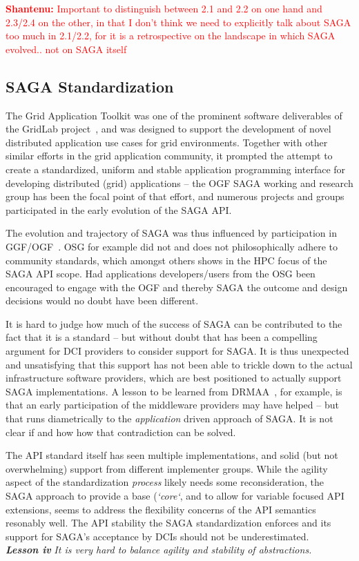 \documentclass[]{article}
\newcommand{\I}[1]{\textit{#1}}
\newcommand{\B}[1]{\textbf{#1}}
\newcommand{\BI}[1]{\textbf{\textit{#1}}}
\newcommand{\jhanote}[1]{{\textcolor{red}{     \B{Shantenu:} #1 }}}
\newcommand{\jhanote}[1]{}
\begin{document}
  \jhanote{Important to distinguish between 2.1 and 2.2 on one hand and
  2.3/2.4 on the other, in that I don't think we need to explicitly talk
  about SAGA too much in 2.1/2.2, for it is a retrospective on the
  landscape in which SAGA evolved.. not on SAGA itself}


 \subsection{SAGA Standardization}

  The Grid Application Toolkit was one of the prominent software
  deliverables of the GridLab project~\cite{gridlab}, and was designed
  to support the development of novel distributed application use cases
  for grid environments.  Together with other similar efforts in the
  grid application community, it prompted the attempt to create
  a standardized, uniform and stable application programming interface
  for developing distributed (grid) applications -- the OGF SAGA working
  and research group has been the focal point of that effort, and
  numerous projects and groups participated in the early evolution of
  the SAGA API.  

  The evolution and trajectory of SAGA was thus influenced by
  participation in GGF/OGF~\cite{ogf_web}.  OSG for example did not and
  does not philosophically adhere to community standards, which amongst
  others shows in the HPC focus of the SAGA API scope. Had applications
  developers/users from the OSG been encouraged to engage with the OGF
  and thereby SAGA the outcome and design decisions would no doubt have
  been different.

  It is hard to judge how much of the success of SAGA can be contributed
  to the fact that it is a standard -- but without doubt that has been
  a compelling argument for DCI providers to consider support for SAGA.
  It is thus unexpected and unsatisfying that this support has not been
  able to trickle down to the actual infrastructure software providers,
  which are best positioned to actually support SAGA implementations.
  A lesson to be learned from DRMAA~\cite{drmaa}, for example, is that
  an early participation of the middleware providers may have helped --
  but that runs diametrically to the \I{application} driven approach of
  SAGA.  It is not clear if and how how that contradiction can be
  solved.

  The API standard itself has seen multiple implementations, and solid
  (but not overwhelming) support from different implementer groups.
  While the agility aspect of the standardization \I{process} likely
  needs some reconsideration, the SAGA approach to provide a base
  (\I{`core`}, and to allow for variable focused API extensions, seems
  to address the flexibility concerns of the API semantics resonably
  well.  The API stability the SAGA standardization enforces and its
  support for SAGA's acceptance by DCIs should not be underestimated.\\
  \BI{Lesson iv} \I{It is very hard to balance agility and stability
  of abstractions.}
\end{document}
